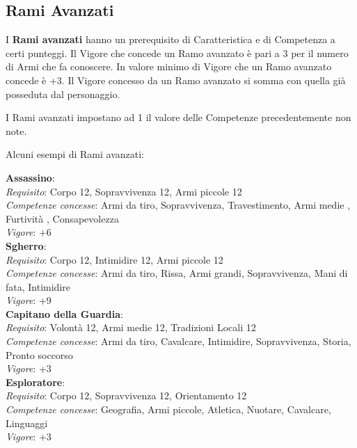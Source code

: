 \documentclass[12pt,a4paper,twoside,openany]{book}
\begin{document}
\begin{multicols}{2}	

\subsection{Rami Avanzati}

I \textbf{Rami avanzati} hanno un prerequisito di Caratteristica e di Competenza a certi punteggi.
Il Vigore che concede un Ramo avanzato è pari a 3 per il numero di Armi che fa conoscere. In valore minimo di Vigore che un Ramo avanzato concede è +3.
Il Vigore concesso da un Ramo avanzato si somma con quella già posseduta dal personaggio.

I Rami avanzati impostano ad 1 il valore delle Competenze precedentemente non note.

Alcuni esempi di Rami avanzati:\medskip

\textbf{Assassino}:\\
\textit{Requisito}: Corpo 12, Sopravvivenza 12, Armi piccole 12\\
\textit{Competenze concesse}: Armi da tiro, Sopravvivenza, Travestimento, Armi medie , Furtività , Consapevolezza\\
\textit{Vigore}: +6\\

\textbf{Sgherro}:\\
\textit{Requisito}: Corpo 12, Intimidire 12, Armi piccole 12\\
\textit{Competenze concesse}: Armi da tiro, Rissa, Armi grandi, Sopravvivenza, Mani di fata, Intimidire\\
\textit{Vigore}: +9\\

\textbf{Capitano della Guardia}:\\
\textit{Requisito}: Volontà 12, Armi medie 12, Tradizioni Locali 12\\
\textit{Competenze concesse}: Armi da tiro, Cavalcare, Intimidire, Sopravvivenza, Storia, Pronto soccorso\\
\textit{Vigore}: +3\\

\textbf{Esploratore}:\\
\textit{Requisito}: Corpo 12, Sopravvivenza 12, Orientamento 12\\
\textit{Competenze concesse}: Geografia, Armi piccole, Atletica, Nuotare, Cavalcare, Linguaggi\\
\textit{Vigore}: +3\\


\end{multicols}
\end{document}
